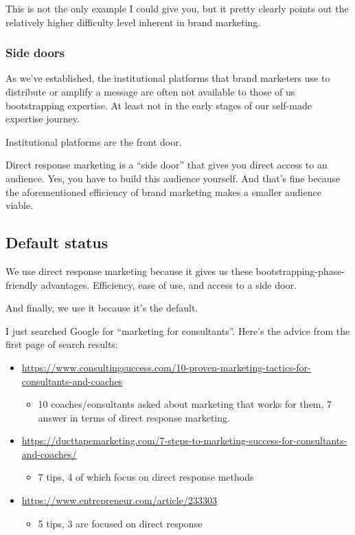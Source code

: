 \documentclass[13pt,]{tufte-handout}
\providecommand{\tightlist}{%
  \setlength{\itemsep}{0pt}\setlength{\parskip}{0pt}}
\begin{document}
This is not the only example I could give you, but it pretty clearly
points out the relatively higher difficulty level inherent in brand
marketing.

\hypertarget{side-doors}{%
\subsubsection{Side doors}\label{side-doors}}

As we've established, the institutional platforms that brand marketers
use to distribute or amplify a message are often not available to those
of us bootstrapping expertise. At least not in the early stages of our
self-made expertise journey.

Institutional platforms are the front door.

Direct response marketing is a ``side door'' that gives you direct
access to an audience. Yes, you have to build this audience yourself.
And that's fine because the aforementioned efficiency of brand marketing
makes a smaller audience viable.

\hypertarget{default-status}{%
\subsection{Default status}\label{default-status}}

We use direct response marketing because it gives us these
bootstrapping-phase-friendly advantages. Efficiency, ease of use, and
access to a side door.

And finally, we use it because it's the default.

I just searched Google for ``marketing for consultants''. Here's the
advice from the first page of search results:

\begin{itemize}
\tightlist
\item
  \url{https://www.consultingsuccess.com/10-proven-marketing-tactics-for-consultants-and-coaches}

  \begin{itemize}
  \tightlist
  \item
    10 coaches/consultants asked about marketing that works for them, 7
    answer in terms of direct response marketing.
  \end{itemize}
\item
  \url{https://ducttapemarketing.com/7-steps-to-marketing-success-for-consultants-and-coaches/}

  \begin{itemize}
  \tightlist
  \item
    7 tips, 4 of which focus on direct response methods
  \end{itemize}
\item
  \url{https://www.entrepreneur.com/article/233303}

  \begin{itemize}
  \tightlist
  \item
    5 tips, 3 are focused on direct response
  \end{itemize}
\end{itemize}
\end{document}
